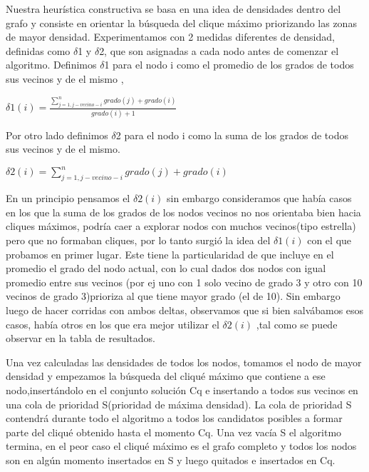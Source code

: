 Nuestra heurística constructiva se basa en una idea de densidades dentro del grafo y consiste en orientar la búsqueda del clique máximo priorizando las zonas de mayor densidad.
Experimentamos con 2 medidas diferentes de densidad, definidas como $\delta$1 y $\delta$2, 
que son asignadas a cada nodo antes de comenzar el algoritmo.
Definimos $\displaystyle \delta$1 para el nodo i  como el promedio de los grados de todos sus vecinos y de el mismo ,

   $\displaystyle \delta1(i) = \frac{\sum_{j=1,j-vecino-i}^{n} grado(j) + grado(i)}{grado(i)+1} $

Por otro lado definimos $\displaystyle \delta$2 para el nodo i como la suma de los grados de todos sus vecinos y de el mismo. 
	
   $\displaystyle \delta2(i) = {\sum_{j=1,j-vecino-i}^{n} grado(j) + grado(i)}$

En un principio pensamos el $ \delta2(i)$ sin embargo consideramos que había casos en los que la suma de los grados de los nodos vecinos no nos orientaba bien hacia cliques máximos, podría caer a explorar nodos con muchos vecinos(tipo estrella) pero que no formaban cliques, por lo tanto surgió la idea del $ \delta1(i)$ con el que probamos en primer lugar.
Este tiene la particularidad de que incluye en el promedio el grado del nodo actual, con lo cual dados dos nodos con igual promedio entre sus vecinos (por ej uno con 1 solo vecino de grado 3 y otro con 10 vecinos de grado 3)prioriza al que tiene mayor grado (el de 10). 
Sin embargo luego de hacer corridas con ambos deltas, observamos que si bien salvábamos esos casos, había otros en los que era mejor utilizar el  $ \delta2(i)$ ,tal como se puede observar en la tabla de resultados.

Una vez calculadas las densidades de todos los nodos, tomamos el nodo de mayor densidad y empezamos la búsqueda del cliqué máximo que contiene a ese nodo,insertándolo en el conjunto solución Cq e insertando a todos sus vecinos en una cola de prioridad S(prioridad de máxima densidad).
La cola de prioridad S contendrá durante todo el algoritmo a todos los candidatos posibles a formar parte del cliqué obtenido hasta el momento Cq.
Una vez vacía S el algoritmo termina, en el peor caso el cliqué máximo es el grafo completo y todos los nodos son en algún momento insertados en S y luego quitados e insertados en Cq.

